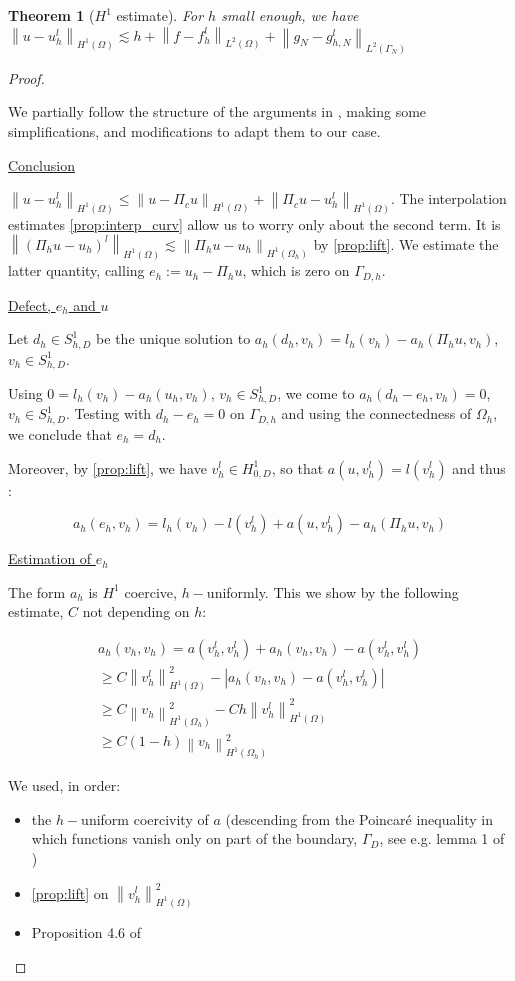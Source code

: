 \documentclass[english,a4paper,10pt,oneside]{scrbook}	%
\theoremstyle{break}
\newtheorem{thm}[equation]{Theorem}
\newenvironment{mproof}[1][\proofname]{%
  \begin{proof}[#1]$ $\par\nobreak\ignorespaces
}{%
  \end{proof}
}
\renewcommand*{\proofname}{Proof}
\theoremstyle{remark}
\newcommand{\norm}[1]{\left\lVert#1\right\rVert}
\begin{document}
\begin{thm}[$H^1$ estimate]
\label{thm:H1_est_ell}
For $h$ small enough, we have $\norm{u-u_h^l}_{H^1(\Omega)} \lesssim h + \norm{f-f_h^l}_{L^2(\Omega)}+ \norm{g_N-g_{h,N}^l}_{L^2(\Gamma_N)}$
\end{thm}
\begin{mproof}

We partially follow the structure of the arguments in \cite{edelmann}, making some simplifications, and modifications to adapt them to our case.

\underline{Conclusion}

$\norm{u-u_h^l}_{H^1(\Omega)}\leq \norm{u-\Pi_c u }_{H^1(\Omega)}+\norm{\Pi_c u-u_h^l}_{H^1(\Omega)}$. The interpolation estimates \cref{prop:interp_curv} allow us to worry only about the second term. It is  $\norm{(\Pi_h u-u_h)^l}_{H^1(\Omega)}\lesssim \norm{\Pi_h u-u_h}_{H^1(\Omega_h)}$ by \cref{prop:lift}. We estimate the latter quantity, calling $e_h := u_h - \Pi_h u$, which is zero on $\Gamma_{D,h}$.

\underline{Defect, $e_h$ and $u$}

Let $d_h \in S^1_{h,D}$ be the unique solution to $a_h(d_h,v_h)=l_h(v_h)-a_h(\Pi_h u,v_h)$, $v_h \in S^1_{h,D}$.

Using $0 = l_h(v_h)-a_h(u_h,v_h)$, $v_h \in S^1_{h,D}$, we come to $a_h(d_h-e_h,v_h)=0$,  $v_h \in S^1_{h,D}$. Testing with $d_h-e_h=0$ on $\Gamma_{D,h}$ and using the connectedness of $\Omega_h$, we conclude that $e_h=d_h$.

Moreover, by \cref{prop:lift}, we have $v_h^l \in H^1_{0,D}$, so that $a(u,v_h^l) = l(v_h^l)$ and thus :

$$a_h(e_h,v_h) = l_h(v_h)-l(v_h^l) + a(u,v_h^l)-a_h(\Pi_h u, v_h)$$

\underline{Estimation of $e_h$}

The form $a_h$ is $H^1$ coercive, $h-$uniformly. This we show by the following estimate, $C$ not depending on $h$:

\begin{align*}
a_h(v_h,v_h) = a(v_h^l,v_h^l) + a_h(v_h,v_h) - a(v_h^l,v_h^l)\\
\geq C\norm{v_h^l}_{H^1(\Omega)}^2 - |a_h(v_h,v_h) - a(v_h^l,v_h^l)|\\
\geq C\norm{v_h}_{H^1(\Omega_h)}^2 -C h \norm{v_h^l}_{H^1(\Omega)}^2\\
\geq C(1-h)\norm{v_h}_{H^1(\Omega_h)}^2
\end{align*} 

We used, in order:
\begin{itemize}
	\item  the $h-$uniform coercivity of $a$ (descending from the Poincaré inequality in which functions vanish only on part of the boundary, $\Gamma_D$, see e.g. lemma 1 of \cite{dorfler})
	\item \cref{prop:lift} on $\norm{v_h^l}_{H^1(\Omega)}^2$
	\item Proposition 4.6 of \cite{edelmann}
\end{itemize}


\end{mproof}
\end{document}
